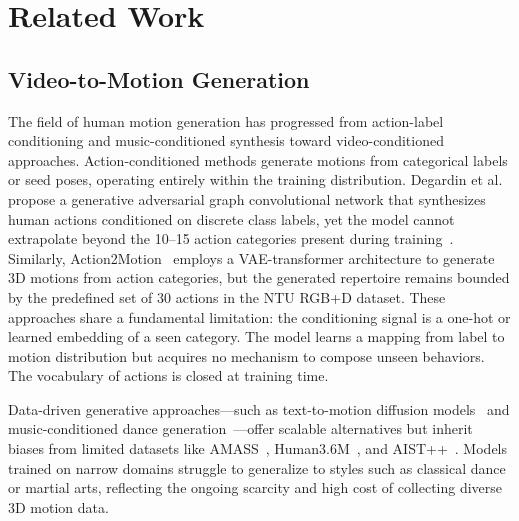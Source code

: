 \section{Related Work}

\subsection{Video-to-Motion Generation}

The field of human motion generation has progressed from action-label conditioning and music-conditioned synthesis toward video-conditioned approaches. Action-conditioned methods generate motions from categorical labels or seed poses, operating entirely within the training distribution. Degardin et al. propose a generative adversarial graph convolutional network that synthesizes human actions conditioned on discrete class labels, yet the model cannot extrapolate beyond the 10--15 action categories present during training~\cite{gagcn2021}. Similarly, Action2Motion~\cite{act2mo2020} employs a VAE-transformer architecture to generate 3D motions from action categories, but the generated repertoire remains bounded by the predefined set of 30 actions in the NTU RGB+D dataset. These approaches share a fundamental limitation: the conditioning signal is a one-hot or learned embedding of a seen category. The model learns a mapping from label to motion distribution but acquires no mechanism to compose unseen behaviors. The vocabulary of actions is closed at training time.

Data-driven generative approaches---such as text-to-motion diffusion models~\cite{motiondiffuse2022} and music-conditioned dance generation~\cite{edge2023}---offer scalable alternatives but inherit biases from limited datasets like AMASS~\cite{amass2019}, Human3.6M~\cite{h3wb2014}, and AIST++~\cite{aist2021}. Models trained on narrow domains struggle to generalize to styles such as classical dance or martial arts, reflecting the ongoing scarcity and high cost of collecting diverse 3D motion data.


